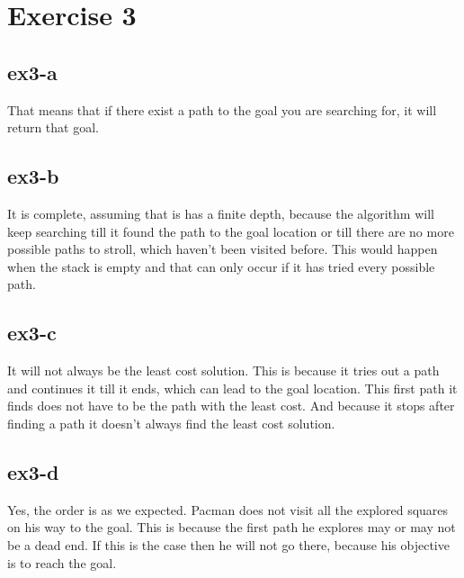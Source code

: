 \newpage{}
\section{Exercise 3}
\subsection{ex3-a}
That means that if there exist a path to the goal you are searching for, it will return that goal.

\subsection{ex3-b}
It is complete, assuming that is has a finite depth, because the algorithm will keep searching till it found the path to the goal location or till there are no more
possible paths to stroll, which haven't been visited before. This would happen when the stack is empty
and that can only occur if it has tried every possible path.

\subsection{ex3-c}
It will not always be the least cost solution. This is because it tries out a path and continues it till it ends, which can
lead to the goal location. This first path it finds does not have to be the path with the least cost.
And because it stops after finding a path it doesn't always find the least cost solution.

\subsection{ex3-d}
Yes, the order is as we expected. Pacman does not visit all the explored squares on his way to the goal. This is because 
the first path he explores may or may not be a dead end. If this is the case then he will not go there, because his objective 
is to reach the goal.